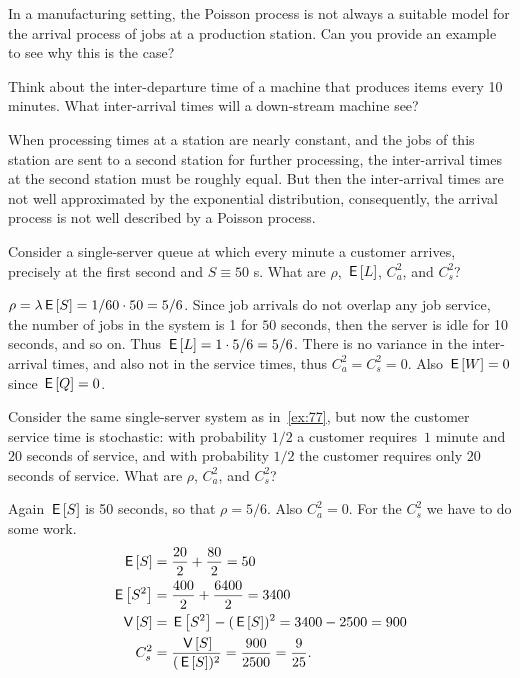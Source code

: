 \documentclass[queueing-book.tex]{subfiles}
\begin{document}
\begin{exercise}
In a manufacturing setting, the Poisson process is not always a suitable model for the arrival process of jobs at a production station. Can you provide an example to see why this is the case?
\begin{hint}
Think about the inter-departure time of a machine that produces items every 10 minutes. What inter-arrival times will a down-stream machine see?

\end{hint}
\begin{solution}
  When processing times at a station are nearly constant, and the jobs of this station are sent to a second station for further processing, the inter-arrival times at the second station must be roughly equal.
  But then the inter-arrival times are not well approximated by the exponential distribution, consequently, the arrival process is not well described by a Poisson process.
\end{solution}
\end{exercise}


\begin{exercise}\label{ex:77}
 Consider  a single-server queue at which every minute a customer arrives, precisely at the first second and $S\equiv 50$ s.
 What are $\rho$, $\,\mathsf{E}\left[L\right]$, $C_a^2$, and $C_s^2$?
\begin{solution}
 $\rho = \lambda \,\mathsf{E}\left[S\right] = 1/60 \cdot 50 = 5/6$.
 Since job arrivals do not overlap any job service, the number of jobs in the system is 1 for $50$ seconds, then the server is idle for 10 seconds, and so on.
 Thus $\,\mathsf{E}\left[L\right] = 1\cdot5/6 = 5/6$.
 There is no variance in the inter-arrival times, and also not in the service times, thus $C_a^2 = C_s^2 = 0$.
 Also $\,\mathsf{E}\left[W\right]=0$ since $\,\mathsf{E}\left[Q\right]=0$.
\end{solution}
\end{exercise}

\begin{exercise}\label{ex:76}
 Consider the same single-server system as in~\cref{ex:77}, but now the customer service time is stochastic: with probability $1/2$ a customer requires~$1$ minute and $20$ seconds of service, and with probability $1/2$ the customer requires only $20$ seconds of service.
 What are $\rho$, $C_a^2$, and $C_s^2$?
\begin{solution}
 Again $\,\mathsf{E}\left[S\right]$ is 50 seconds, so that $\rho = 5/6$. Also
 $C_a^2=0$. For the $C_s^2$ we have to do some work.
 \begin{equation*}
 \begin{split}
 \,\mathsf{E}\left[S\right] &= \frac{20}2 + \frac{80}2 = 50 \\
 \,\mathsf{E}\left[S^2\right] &= \frac{400}2 + \frac{6400} 2 = 3400 \\
 \,\mathsf{V}\left[S\right] &= \,\mathsf{E}\left[S^2\right] - (\,\mathsf{E}\left[S\right])^2 = 3400 - 2500 = 900 \\
 C_s^2 &= \frac{\,\mathsf{V}\left[S\right]}{(\,\mathsf{E}\left[S\right])^2} = \frac{900}{2500}=\frac{9}{25}.
 \end{split}
 \end{equation*}
\end{solution}
\end{exercise}
\end{document}
